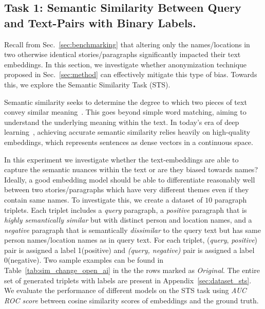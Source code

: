 \subsection{Task 1: Semantic Similarity Between Query and Text-Pairs with Binary Labels.}
\label{sec:exp_sts_binary}
Recall from Sec.~\ref{sec:benchmarking} that altering only the names/locations in two otherwise identical stories/paragraphs significantly impacted their text embeddings. In this section, we investigate whether anonymization technique proposed in Sec.~\ref{sec:method} can effectively mitigate this type of bias. Towards this, we explore the Semantic Similarity Task (STS).


Semantic similarity seeks to determine the degree to which two pieces of text convey similar meaning~\cite{muennighoff2022mteb, reimers2019sentence}. This goes beyond simple word matching, aiming to understand the underlying meaning within the text. In today's era of deep learning~\cite{reimers2016task, muennighoff2022mteb}, achieving accurate semantic similarity relies heavily on high-quality embeddings, which represents sentences as dense vectors in a continuous space. 

In this experiment we investigate whether the text-embeddings are able to capture the semantic nuances within the text or are they biased towards names? Ideally, a good embedding model should be able to differentiate reasonably well between two stories/paragraphs which have very different themes even if they contain same names. To investigate this, we create a dataset of $10$ paragraph triplets. Each triplet includes a \textit{query} paragraph, a \textit{positive} paragraph that is \textit{highly semantically similar} but with distinct person and location names, and a \textit{negative} paragraph that is semantically \textit{dissimilar} to the query text but has same person names/location names as in query text. For each triplet, (\textit{query}, \textit{positive}) pair is assigned a label 1(positive) and \textit{(query, negative)} pair is assigned a label 0(negative). Two sample examples can be found in Table~\ref{tab:sim_change_open_ai} in the the rows marked as \textit{Original}. The entire set of generated triplets with labels are present in Appendix~\ref{sec:dataset_sts}.  We evaluate the performance of different models on the STS task using \textit{AUC ROC score} between cosine similarity scores of embeddings and the ground truth.  


